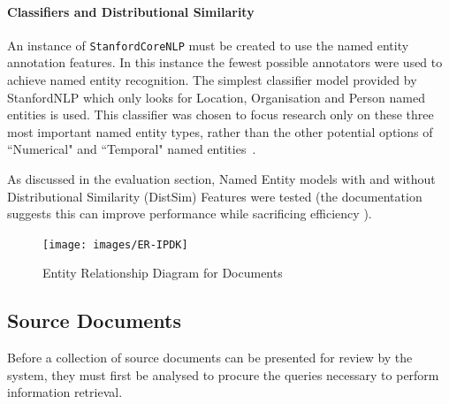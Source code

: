 \documentclass{l4proj}
\newcommand{\code}[1]{\texttt{#1}}
\begin{document}
\paragraph{Classifiers and Distributional Similarity} \label{classifiers}
An instance of \code{StanfordCoreNLP} must be created to use the named entity annotation features.
In this instance the fewest possible annotators were used to achieve named entity recognition. The simplest classifier model provided by StanfordNLP which only looks for Location, Organisation and Person named entities is used. This classifier was chosen to focus research only on these three most important named entity types, rather than the other potential options of ``Numerical" and ``Temporal" named entities~\cite{neroptions}.

As discussed in the evaluation section, Named Entity models with and without Distributional Similarity (DistSim) Features were tested (the documentation suggests this can improve performance while sacrificing efficiency \cite{distsimfeatures}).

\begin{figure}[H]
\centering
\texttt{[image: images/ER-IPDK]}
\caption{Entity Relationship Diagram for Documents}
\label{er}
\end{figure}

\subsection{Source Documents}
Before a collection of source documents can be presented for review by the system, they must first be analysed to procure the queries necessary to perform information retrieval.
\end{document}
